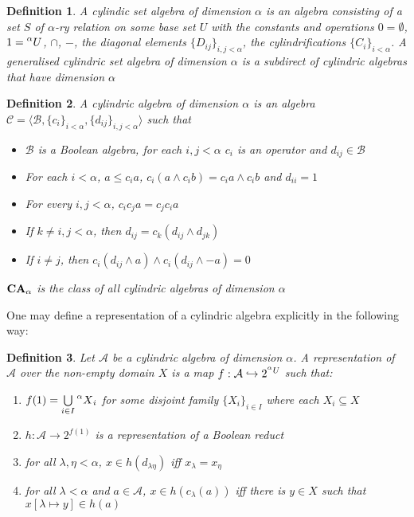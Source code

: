 \documentclass[a4paper]{article}
\theoremstyle{defin}
\newtheorem{defin}{Definition}
\theoremstyle{theorem}
\theoremstyle{prop}
\theoremstyle{lemma}
\theoremstyle{fact}
\theoremstyle{ex}
\theoremstyle{col}
\begin{document}
\begin{defin}
  A cylindic set algebra of dimension $\alpha$ is an algebra consisting of a set $S$ of $\alpha$-ry relation on some base set $U$
    with the constants and operations $0 = \emptyset$, $1 = \prescript{\alpha}{}U$, $\cap$, $-$, the diagonal elements $\{ D_{ij} \}_{i, j < \alpha}$, the cylindrifications $\{ C_i \}_{i < \alpha}$. A generalised cylindric set algebra of dimension $\alpha$ is a subdirect of cylindric algebras that have dimension $\alpha$
\end{defin}

\begin{defin}
    A cylindric algebra of dimension $\alpha$ is an algebra $\mathcal{C} = \langle \mathcal{B}, \{ c_i \}_{i < \alpha}, \{ d_{ij} \}_{i, j < \alpha} \rangle$ such that
    \begin{itemize}
      \item $\mathcal{B}$ is a Boolean algebra, for each $i, j < \alpha$ $c_i$ is an operator and $d_{ij} \in \mathcal{B}$
      \item For each $i < \alpha$, $a \leq c_i a$, $c_i (a \land c_i b) = c_i a \land c_i b$ and $d_{ii} = 1$
      \item For every $i, j < \alpha$, $c_i c_j a = c_j c_i a$
      \item If $k \neq i, j < \alpha$, then $d_{ij} = c_k (d_{ij} \land d_{jk})$
      \item If $i \neq j$, then $c_i (d_{ij} \land a) \land c_i (d_{ij} \land - a) = 0$
    \end{itemize}
    ${\bf CA}_{\alpha}$ is the class of all cylindric algebras of dimension $\alpha$
\end{defin}

One may define a representation of a cylindric algebra explicitly in the following way:

\begin{defin}
  Let $\mathcal{A}$ be a cylindric algebra of dimension $\alpha$. A representation of $\mathcal{A}$ over the non-empty domain $X$ is a map $f : \mathcal{A} \hookrightarrow 2^{\prescript{\alpha}{}U}$ such that:
  \begin{enumerate}
    \item $f(1) = \bigcup \limits_{i \in I} \prescript{\alpha}{}X_i$ for some disjoint family $\{X_i\}_{i \in I}$ where each $X_i \subseteq X$
    \item $h : \mathcal{A} \to 2^{f(1)}$ is a representation of a Boolean reduct
    \item for all $\lambda, \eta < \alpha$, $x \in h(d_{\lambda \eta})$ iff $x_{\lambda} = x_{\eta}$
    \item for all $\lambda < \alpha$ and $a \in \mathcal{A}$, $x \in h(c_{\lambda}(a))$ iff there is $y \in X$ such that $x[\lambda \mapsto y] \in h(a)$
  \end{enumerate}
\end{defin}
\end{document}
